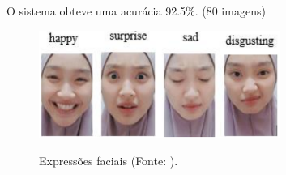\begin{frame}
    \frametitle{}
    
O sistema obteve uma acurácia 92.5\%. (80 imagens)
\begin{figure}[!ht]
    \centering
    \caption{Expressões faciais (Fonte: \textcite{BadrulhishamMangshor2021}).}
      \includegraphics[width=0.7\textwidth]{images/BadrulhishamMangshor2021.png}
    \label{fig:BadrulhishamMangshor2021}
\end{figure}

\end{frame}
